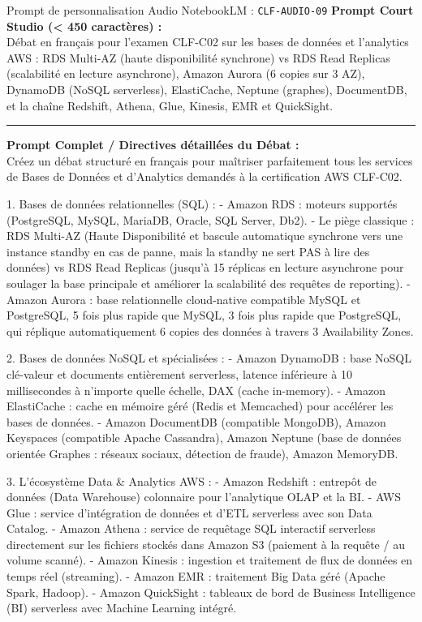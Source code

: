 \documentclass[11pt,a4paper]{article}
\begin{document}
\begin{promptbox}{Prompt de personnalisation Audio NotebookLM : \texttt{CLF-AUDIO-09}}
\textbf{Prompt Court Studio (< 450 caractères) :}\\
Débat en français pour l'examen CLF-C02 sur les bases de données et l'analytics AWS : RDS Multi-AZ (haute disponibilité synchrone) vs RDS Read Replicas (scalabilité en lecture asynchrone), Amazon Aurora (6 copies sur 3 AZ), DynamoDB (NoSQL serverless), ElastiCache, Neptune (graphes), DocumentDB, et la chaîne Redshift, Athena, Glue, Kinesis, EMR et QuickSight.

\medskip\hrule\medskip
\textbf{Prompt Complet / Directives détaillées du Débat :}\\
Créez un débat structuré en français pour maîtriser parfaitement tous les services de Bases de Données et d'Analytics demandés à la certification AWS CLF-C02.

1. Bases de données relationnelles (SQL) :
- Amazon RDS : moteurs supportés (PostgreSQL, MySQL, MariaDB, Oracle, SQL Server, Db2).
- Le piège classique : RDS Multi-AZ (Haute Disponibilité et bascule automatique synchrone vers une instance standby en cas de panne, mais la standby ne sert PAS à lire des données) vs RDS Read Replicas (jusqu'à 15 réplicas en lecture asynchrone pour soulager la base principale et améliorer la scalabilité des requêtes de reporting).
- Amazon Aurora : base relationnelle cloud-native compatible MySQL et PostgreSQL, 5 fois plus rapide que MySQL, 3 fois plus rapide que PostgreSQL, qui réplique automatiquement 6 copies des données à travers 3 Availability Zones.

2. Bases de données NoSQL et spécialisées :
- Amazon DynamoDB : base NoSQL clé-valeur et documents entièrement serverless, latence inférieure à 10 millisecondes à n'importe quelle échelle, DAX (cache in-memory).
- Amazon ElastiCache : cache en mémoire géré (Redis et Memcached) pour accélérer les bases de données.
- Amazon DocumentDB (compatible MongoDB), Amazon Keyspaces (compatible Apache Cassandra), Amazon Neptune (base de données orientée Graphes : réseaux sociaux, détection de fraude), Amazon MemoryDB.

3. L'écosystème Data & Analytics AWS :
- Amazon Redshift : entrepôt de données (Data Warehouse) colonnaire pour l'analytique OLAP et la BI.
- AWS Glue : service d'intégration de données et d'ETL serverless avec son Data Catalog.
- Amazon Athena : service de requêtage SQL interactif serverless directement sur les fichiers stockés dans Amazon S3 (paiement à la requête / au volume scanné).
- Amazon Kinesis : ingestion et traitement de flux de données en temps réel (streaming).
- Amazon EMR : traitement Big Data géré (Apache Spark, Hadoop).
- Amazon QuickSight : tableaux de bord de Business Intelligence (BI) serverless avec Machine Learning intégré.
\end{promptbox}
\end{document}
